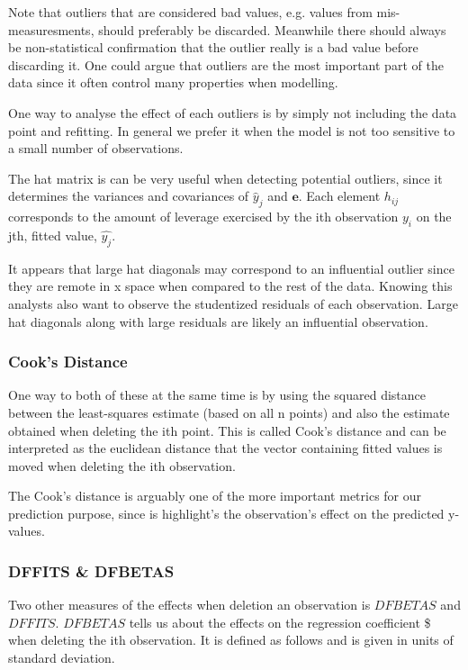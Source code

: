 \documentclass[11pt]{article}
\begin{document}
Note that outliers that are considered bad values, e.g. values from mis-measuresments,
should preferably be discarded. Meanwhile there should
always be non-statistical confirmation that the outlier really is a bad value before discarding it. One
could argue that outliers are the most important part of the data since it often control many 
properties when modelling. 

One way to analyse the effect of each outliers is by simply not including the data point and refitting.
In general we prefer it when the model is not too sensitive to a small number of observations. 

The hat matrix is can be very useful when detecting potential outliers, since it determines the variances
and covariances of \(\hat{y}_j\) and \(\textbf{e}\). Each element \(h_{ij}\) corresponds to the amount of
leverage exercised by the ith observation \(y_i\) on the jth, fitted value, \(\hat{y_j}\).

It appears that large hat diagonals may correspond to an influential outlier since they are remote
in x space when compared to the rest of the data. Knowing this analysts also want to observe
the studentized residuals of each observation. Large hat diagonals along with large residuals 
are likely an influential observation. 

\subsubsection{Cook's Distance}
\label{sec:org026f396}

One way to both of these at the same time is by using the squared distance between the least-squares
estimate (based on all n points) and also the estimate obtained when deleting the ith point. This is
called Cook’s distance and can be interpreted as the euclidean distance that the vector containing fitted
values is moved when deleting the ith observation. 

The Cook's distance is arguably one of the more important metrics for our prediction purpose, since is highlight's
the observation's effect on the predicted y-values. \cite{22286}

\subsubsection{DFFITS \& DFBETAS}
\label{sec:org1b1aefb}

Two other measures of the effects when deletion an observation is \(DFBETAS\) and \(DFFITS\). \(DFBETAS\) tells us
about the effects on the regression coefficient \$ when deleting the ith observation. It is defined as
follows and is given in units of standard deviation.
\end{document}
